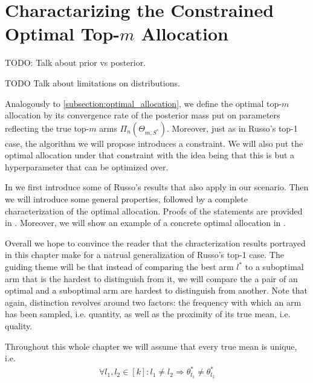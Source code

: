 \chapter{Charactarizing the Constrained Optimal Top-$m$ Allocation}

TODO: Talk about prior vs posterior.

TODO Talk about limitations on distributions.

Analogously to \ref{subsection:optimal_allocation}, we define the optimal top-$m$ allocation by its convergence rate of the posterior mass put on parameters reflecting the true top-$m$ arms $\Pi_n(\Theta_{m, S^*})$. Moreover, just as in Russo's top-1 case, the algorithm we will propose introduces a constraint. We will also put the optimal allocation under that constraint with the idea being that this is but a hyperparameter that can be optimized over.

In  we first introduce some of Russo's results that also apply in our scenario. Then we will introduce some general properties, followed by a complete characterization of the optimal allocation. Proofs of the statements are provided in . Moreover, we will show an example of a concrete optimal allocation in .

Overall we hope to convince the reader that the chracterization results portrayed in this chapter make for a natrual generalization of Russo's top-1 case. The guiding theme will be that instead of comparing the best arm $l^*$ to a suboptimal arm that is the hardest to distinguish from it, we will compare the a pair of an optimal and a suboptimal arm are hardest to distinguish from another. Note that again, distinction revolves around two factors: the frequency with which an arm has been sampled, i.e. quantity, as well as the proximity of its true mean, i.e. quality.

Throughout this whole chapter we will assume that every true mean is unique, i.e.
\begin{align}
  \forall l_1, l_2 \in [k]: l_1 \neq l_2 \Rightarrow \theta^*_{l_1} \neq \theta^*_{l_2}
\end{align}


